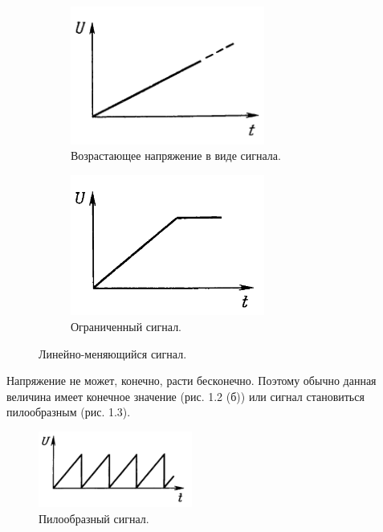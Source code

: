 \begin{figure}[H]
     \begin{subfigure}[H]{0.45\textwidth}
         \centering
         \includegraphics[width=0.70\textwidth]{../image/s_la.png}
         \caption{Возрастающее напряжение в виде сигнала.}
     \end{subfigure}
     \hfill
     \begin{subfigure}[H]{0.45\textwidth}
         \centering
         \includegraphics[width=0.70\textwidth]{../image/s_lb.png}
         \caption{Ограниченный сигнал.}
     \end{subfigure}
        \caption{Линейно-меняющийся сигнал.}
\end{figure}

	Напряжение не может, конечно, расти бесконечно. Поэтому обычно данная величина имеет конечное значение (рис. 1.2 (б)) или сигнал становиться пилообразным (рис. 1.3).

	\begin{figure}[H]
    \centering
    \includegraphics[width=0.45\textwidth]{../image/s_saw.png}
    \caption{Пилообразный сигнал.}
	\end{figure}

